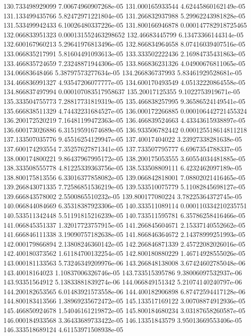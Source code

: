 {130.733498929099 7.00674960907268e-05
131.000165933544 4.62445860162149e-05
131.133499435766 5.82472971221804e-05
131.266832937988 5.29962243981828e-05
131.533499942433 6.10026480337226e-05
131.800166946878 0.000147782918725465
132.066833951323 0.000131552463298652
132.46683445799 6.13473366144314e-05
132.600167960213 5.29641976813496e-05
132.866834964658 8.07416039407516e-05
133.066835217991 5.81604491093613e-05
133.333502222436 2.16984735431863e-05
133.466835724659 7.23248871944306e-05
133.866836231326 4.04900676811065e-05
134.06683648466 5.38797573277634e-05
134.266836737993 5.83461929528681e-05
134.466836991327 4.93547206077777e-05
134.600170493549 4.05132220864558e-05
134.866837497994 0.000107083517958637
135.20017125355 9.1022753919671e-05
135.333504755773 7.28817731819319e-05
135.466838257995 9.36586524149541e-05
135.666838511329 4.74432231684527e-05
136.000172266885 0.000106442721455324
136.200172520219 7.16481199472363e-05
136.466839524663 4.43343615938897e-05
136.600173026886 6.31519591674689e-05
136.933506782442 0.000125518614811218
137.133507035776 9.45516254129947e-05
137.40017404022 3.23927338281638e-05
137.600174293554 7.35257627871341e-05
137.733507795777 6.6967354788337e-05
138.000174800221 9.86437967995172e-05
138.200175053555 3.60554034481885e-05
138.333508555778 4.81225339363756e-05
138.533508809111 6.4232462097189e-05
138.800175813556 6.33016377858082e-05
139.066842818001 7.08802021416465e-05
139.266843071335 7.72586851536219e-05
139.533510075779 5.11082845698127e-05
139.666843578002 2.5500865510232e-05
139.800177080224 3.78225364372745e-05
140.066844084669 6.35318387923306e-05
140.333511089114 0.000110334210235751
140.533511342448 5.51191815216239e-05
140.733511595781 6.35786258416466e-05
141.066845351337 1.32017723757915e-05
141.266845604671 2.15337140552662e-05
141.666846111338 3.19090757182638e-05
141.866846364672 2.14378999251993e-05
142.000179866894 2.13808246360142e-05
142.266846871339 2.45722082026016e-05
142.400180373562 1.61184700132254e-05
142.800180880229 1.46714928555026e-05
143.000181133563 5.73246349209976e-06
143.266848138008 3.67424602785048e-06
143.40018164023 1.10837006326746e-05
143.733515395786 9.38006097532937e-06
143.93351564912 5.13833881839274e-06
144.066849151342 5.21074140240797e-06
144.200182653565 6.01483921573558e-06
144.400182906898 6.87472594417128e-06
144.800183413566 1.38969235672472e-05
145.133517169122 3.00708874912936e-05
145.466850924678 1.54046161219872e-05
145.800184680234 3.03187658260587e-05
146.000184933568 3.36433689733422e-05
146.13351843579 3.95013669553406e-05
146.333518689124 4.61153971508938e-05
}
